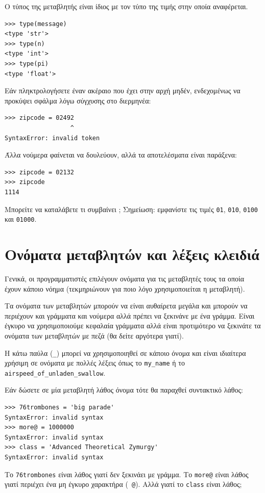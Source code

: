 \documentclass[10pt]{book}
\begin{document}
Ο τύπος της μεταβλητής είναι ίδιος με τον τύπο της τιμής στην οποία αναφέρεται.

\begin{verbatim}
>>> type(message)
<type 'str'>
>>> type(n)
<type 'int'>
>>> type(pi)
<type 'float'>
\end{verbatim}
\vfill
\begin{exercise}

Εάν πληκτρολογήσετε έναν ακέραιο που έχει στην αρχή μηδέν, ενδεχομένως
να προκύψει σφάλμα λόγω σύγχυσης στο διερμηνέα:

\begin{verbatim}
>>> zipcode = 02492
                  ^
SyntaxError: invalid token
\end{verbatim}

Άλλα νούμερα φαίνεται να δουλεύουν, αλλά τα αποτελέσματα είναι παράξενα:

\begin{verbatim}
>>> zipcode = 02132
>>> zipcode
1114
\end{verbatim}

Μπορείτε να καταλάβετε τι συμβαίνει ;  Σημείωση: εμφανίστε τις
τιμές  {\tt 01}, {\tt 010}, {\tt 0100}  και  {\tt 01000}.
\end{exercise}



\section{Ονόματα μεταβλητών και λέξεις κλειδιά}

Γενικά, οι προγραμματιστές επιλέγουν ονόματα για τις μεταβλητές τους
τα οποία έχουν κάποιο νόημα (τεκμηριώνουν για ποιο λόγο χρησιμοποιείται
η μεταβλητή).

Τα ονόματα των μεταβλητών μπορούν να είναι αυθαίρετα μεγάλα και 
μπορούν να περιέχουν και γράμματα και νούμερα αλλά πρέπει να
ξεκινάνε με ένα γράμμα.  Είναι έγκυρο να χρησιμοποιούμε κεφαλαία
γράμματα αλλά είναι προτιμότερο να ξεκινάτε τα ονόματα των μεταβλητών
με πεζά (θα δείτε αργότερα γιατί).

Η κάτω παύλα (\verb"_") μπορεί να χρησιμοποιηθεί σε κάποιο όνομα και 
είναι ιδιαίτερα χρήσιμη σε ονόματα με πολλές λέξεις όπως το 
\verb"my_name" ή το \verb"airspeed_of_unladen_swallow".


Εάν δώσετε σε μία μεταβλητή λάθος όνομα τότε θα παραχθεί συντακτικό λάθος:

\begin{verbatim}
>>> 76trombones = 'big parade'
SyntaxError: invalid syntax
>>> more@ = 1000000
SyntaxError: invalid syntax
>>> class = 'Advanced Theoretical Zymurgy'
SyntaxError: invalid syntax
\end{verbatim}
%
 Το {\tt 76trombones} είναι λάθος γιατί δεν ξεκινάει με γράμμα.  
Το {\tt more@} είναι λάθος γιατί περιέχει ένα μη έγκυρο χαρακτήρα ({\tt
@}). Αλλά γιατί το {\tt class} είναι λάθος;
\end{document}
